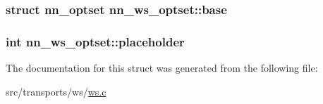 \subsubsection[{base}]{\setlength{\rightskip}{0pt plus 5cm}struct {\bf nn\+\_\+optset} nn\+\_\+ws\+\_\+optset\+::base}\hypertarget{structnn__ws__optset_a88e3f6c3846eb4142b038b3723d7a284}{}\label{structnn__ws__optset_a88e3f6c3846eb4142b038b3723d7a284}
\subsubsection[{placeholder}]{\setlength{\rightskip}{0pt plus 5cm}int nn\+\_\+ws\+\_\+optset\+::placeholder}\hypertarget{structnn__ws__optset_ad487ef22a8d90519c7b858707bfb997a}{}\label{structnn__ws__optset_ad487ef22a8d90519c7b858707bfb997a}


The documentation for this struct was generated from the following file\+:\begin{DoxyCompactItemize}
\item 
src/transports/ws/\hyperlink{src_2transports_2ws_2ws_8c}{ws.\+c}\end{DoxyCompactItemize}
